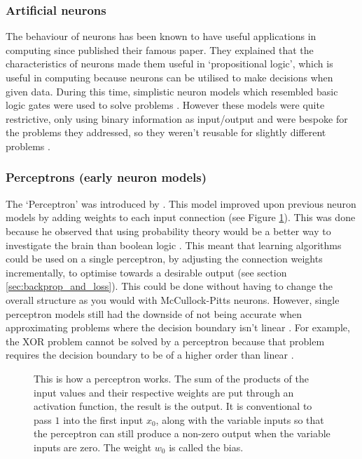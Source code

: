 \documentclass[12pt]{article}
\newcommand{\vectorimage}[1]{
    \def\svgwidth{5.5in}
    {#1.pdf_tex}
}
\begin{document}
	\subsubsection{Artificial neurons}
	\label{sec:artificial_neurons}
	
	The behaviour of neurons has been known to have useful applications in computing since  \textcite{McCullock_Pitts} published their famous paper. They explained that the characteristics of neurons made them useful in `propositional logic', which is useful in computing because neurons can be utilised to make decisions when given data. During this time, simplistic neuron models which resembled basic logic gates were used to solve problems \parencite[p.99]{McCullock_Pitts}. However these models were quite restrictive, only using binary information as input/output and were bespoke for the problems they addressed, so they weren't reusable for slightly different problems \parencite[p.29-33]{Rojas}.\medskip
	
	\subsubsection{Perceptrons (early neuron models)}
	\label{sec:perceptron}
	
	The `Perceptron' was introduced by \textcite{Rosenblatt}. This model improved upon previous neuron models by adding weights to each input connection (see Figure \ref{fig:perceptron}). This was done because he observed that using probability theory would be a better way to investigate the brain than boolean logic \parencite[p387-388]{Rosenblatt}. This meant that learning algorithms could be used on a single perceptron, by adjusting the connection weights incrementally, to optimise towards a desirable output (see section \ref{sec:backprop_and_loss}). This could be done without having to change the overall structure as you would with McCullock-Pitts neurons. However, single perceptron models still had the downside of not being accurate when approximating problems where the decision boundary isn't linear \parencite{Raschka}. For example, the XOR problem cannot be solved by a perceptron because that problem requires the decision boundary to be of a higher order than linear \parencite[p.124-127]{Rojas}.\medskip
    
    \begin{figure}[h!]
        \centering
        \fbox{\vectorimage{perceptron}}
        \caption{This is how a perceptron works. The sum of the products of the input values and their respective weights are put through an activation function, the result is the output. It is conventional to pass $1$ into the first input $x_0$, along with the variable inputs so that the perceptron can still produce a non-zero output when the variable inputs are zero. The weight $w_0$ is called the bias.}
        \label{fig:perceptron}
    \end{figure}
    
\end{document}
